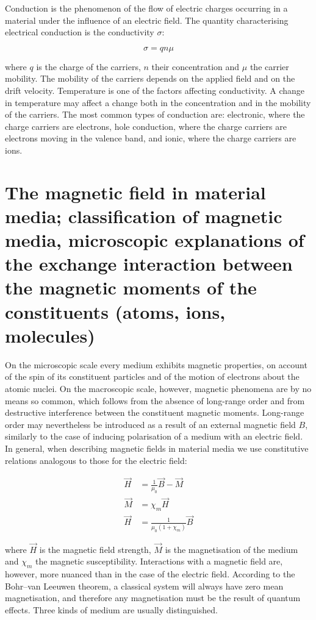 Conduction is the phenomenon of the flow of electric charges occurring in a material under the influence of an electric field. The quantity characterising electrical conduction is the conductivity $\sigma$:

\begin{equation}
    \sigma = q n \mu
\end{equation}

where $q$ is the charge of the carriers, $n$ their concentration and $\mu$ the carrier mobility. The mobility of the carriers depends on the applied field and on the drift velocity. Temperature is one of the factors affecting conductivity. A change in temperature may affect a change both in the concentration and in the mobility of the carriers. The most common types of conduction are: electronic, where the charge carriers are electrons, hole conduction, where the charge carriers are electrons moving in the valence band, and ionic, where the charge carriers are ions.

\section{The magnetic field in material media; classification of magnetic media, microscopic explanations of the exchange interaction between the magnetic moments of the constituents (atoms, ions, molecules)}

On the microscopic scale every medium exhibits magnetic properties, on account of the spin of its constituent particles and of the motion of electrons about the atomic nuclei. On the macroscopic scale, however, magnetic phenomena are by no means so common, which follows from the absence of long-range order and from destructive interference between the constituent magnetic moments. Long-range order may nevertheless be introduced as a result of an external magnetic field $B$, similarly to the case of inducing polarisation of a medium with an electric field. In general, when describing magnetic fields in material media we use constitutive relations analogous to those for the electric field:

\begin{align*}
    \vec{H} &= \frac{1}{\mu_0}\vec{B} - \vec{M} \\
    \vec{M} &= \chi_m\vec{H} \\
    \vec{H} &= \frac{1}{\mu_0(1+\chi_m)}\vec{B}
\end{align*}

where $\vec{H}$ is the magnetic field strength, $\vec{M}$ is the magnetisation of the medium and $\chi_m$ the magnetic susceptibility. Interactions with a magnetic field are, however, more nuanced than in the case of the electric field. According to the Bohr--van Leeuwen theorem, a classical system will always have zero mean magnetisation, and therefore any magnetisation must be the result of quantum effects. Three kinds of medium are usually distinguished.

